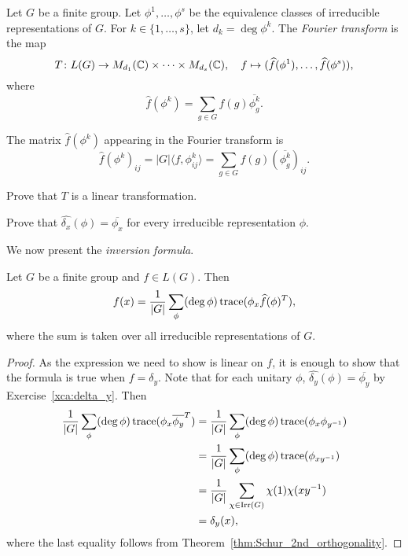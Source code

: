 \begin{definition}
  Let $G$ be a finite group. Let $\phi^1,\dots,\phi^s$ be the equivalence classes 
  of irreducible representations of $G$. For $k\in\{1,\dots,s\}$, let 
  $d_k=\deg\phi^k$. 
  The \emph{Fourier transform} is the map  
  \[
    T\colon L(G)\to M_{d_1}(\mathbb{C})\times\cdots\times M_{d_s}(\mathbb{C}),
    \quad
    f\mapsto (\widehat{f}(\phi^1),\dots,\widehat{f}(\phi^s)),
  \]
  where  
  \[
    \widehat{f}(\phi^k)=\sum_{g\in G}f(g)\overline{\phi_g^k}.
  \]
\end{definition}

The matrix 
  $\widehat{f}(\phi^k)$ appearing in the Fourier transform is 
  \[
    \widehat{f}(\phi^k)_{ij}=|G|\langle f,\phi_{ij}^k\rangle=\sum_{g\in G}f(g)\left(\overline{\phi^k_g}\right)_{ij}.
  \]


\begin{exercise}
  \label{xca:Tlineal}
  Prove that $T$ is a linear transformation. 
\end{exercise}

\begin{exercise}
\label{xca:delta_y}
  Prove that $\widehat{\delta_x}(\phi)=\overline{\phi_x}$ for every
  irreducible representation $\phi$.  
\end{exercise}

We now present the \emph{inversion formula}. 

\begin{theorem}
  \label{thm:inversion}
  Let $G$ be a finite group and $f\in L(G)$. Then 
  \[
    f(x)=\frac{1}{|G|}\sum_{\phi}(\deg\phi)\operatorname{trace}(\phi_x \widehat{f}(\phi)^T),
  \]
  where the sum is taken over all irreducible representations of $G$. 
\end{theorem}

\begin{proof}
  As the expression we need to show is linear on $f$, it is enough to 
  show that the formula is true when 
  $f=\delta_y$. Note that for each unitary $\phi$,   
  $\widehat{\delta_y}(\phi)=\overline{\phi_y}$ by Exercise~\ref{xca:delta_y}. Then 
  \begin{align*}
    \frac{1}{|G|}\sum_{\phi}(\deg\phi)\operatorname{trace}(\phi_x\overline{\phi_y}^T)
    &=\frac{1}{|G|}\sum_{\phi}(\deg\phi)\operatorname{trace}(\phi_x\phi_{y^{-1}})\\
    &=\frac{1}{|G|}\sum_{\phi}(\deg\phi)\operatorname{trace}(\phi_{xy^{-1}})\\
    &=\frac{1}{|G|}\sum_{\chi\in\operatorname{Irr}(G)}\chi(1)\chi(xy^{-1})\\
    &=\delta_y(x),
  \end{align*}
  where the last equality follows from Theorem~\ref{thm:Schur_2nd_orthogonality}.
\end{proof}

